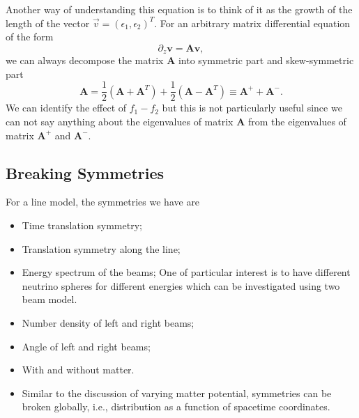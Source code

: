 




Another way of understanding this equation is to think of it as the growth of the length of the vector $\vec v = (\epsilon_1,\epsilon_2)^T$. For an arbitrary matrix differential equation of the form
\begin{equation*}
  \partial_z \mathbf v = \mathbf A \mathbf v,
\end{equation*}
we can always decompose the matrix $\mathbf A$ into symmetric part and skew-symmetric part
\begin{equation*}
  \mathbf A = \frac{1}{2}(\mathbf A + \mathbf A^T) + \frac{1}{2}(\mathbf A - \mathbf A^T) \equiv \mathbf A^+ + \mathbf A^-.
\end{equation*}
We can identify the effect of $f_1-f_2$ but this is not particularly useful since we can not say anything about the eigenvalues of matrix $\mathbf A$ from the eigenvalues of matrix $\mathbf A^+$ and $\mathbf A^-$.



\subsection{Breaking Symmetries}



For a line model, the symmetries we have are
\begin{itemize}
    \item Time translation symmetry;
\item Translation symmetry along the line;
\item Energy spectrum of the beams; One of particular interest is to have different neutrino spheres for different energies which can be investigated using two beam model.
\item Number density of left and right beams;
\item Angle of left and right beams;
\item With and without matter.
\item Similar to the discussion of varying matter potential, symmetries can be broken globally, i.e., distribution as a function of spacetime coordinates.
\end{itemize}

